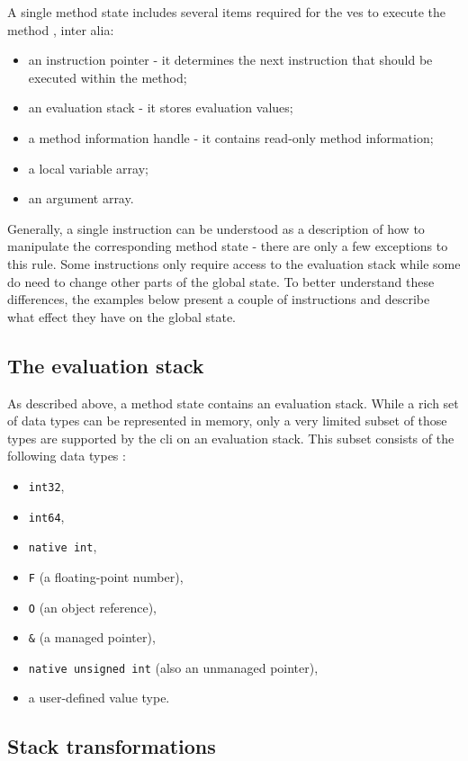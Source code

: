 \documentclass{article}
\numberwithin{equation}{section}
\begin{document}
A single method state includes several items required for the \acrshort{ves} to execute the method \cite{ecmaStandard}, inter alia:
\begin{itemize}
	\item{an instruction pointer - it determines the next instruction that should be executed within the method;}
	\item{an evaluation stack - it stores evaluation values;}
	\item{a method information handle - it contains read-only method information;}
	\item{a local variable array;}
	\item{an argument array.}
\end{itemize}

Generally, a single instruction can be understood as a description of how to manipulate the corresponding method state - there are only a few exceptions to this rule. Some instructions only require access to the evaluation stack while some do need to change other parts of the global state. To better understand these differences, the examples below present a couple of instructions and describe what effect they have on the global state.

\subsection{The evaluation stack}

As described above, a method state contains an evaluation stack. While a rich set of data types can be represented in memory, only a very limited subset of those types are supported by the \acrshort{cli} on an evaluation stack. This subset consists of the following data types \cite{ecmaStandard}:
\begin{itemize}
	\item{\texttt{int32},}
	\item{\texttt{int64},}
	\item{\texttt{native int},}
	\item{\texttt{F} (a floating-point number),}
	\item{\texttt{O} (an object reference),}
	\item{\texttt{\&} (a managed pointer),}
	\item{\texttt{native unsigned int} (also an unmanaged pointer),}
	\item{a user-defined value type.}
\end{itemize}

\subsection{Stack transformations}
\label{sec:stackTransformations}
\end{document}
